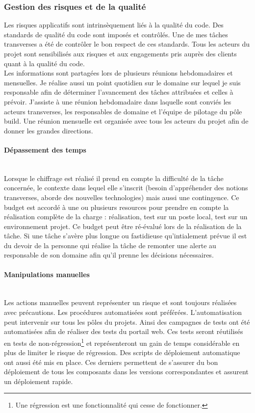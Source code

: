 \documentclass[12pt,a4paper]{article}
\begin{document}
\subsubsection{Gestion des risques et de la qualité}
Les risques applicatifs sont intrinsèquement liés à la qualité du code. Des standards de qualité du code sont imposés et contrôlés. Une de mes tâches transverses a été de contrôler le bon respect de ces standards. Tous les acteurs du projet sont sensibilisés aux risques et aux engagements pris auprès des clients quant à la qualité du code.\\
Les informations sont partagées lors de plusieurs réunions hebdomadaires et mensuelles. Je réalise aussi un point quotidien sur le domaine sur lequel je suis responsable afin de déterminer l'avancement des tâches attribuées et celles à prévoir. J'assiste à une réunion hebdomadaire dans laquelle sont conviés les acteurs transverses, les responsables de domaine et l'équipe de pilotage du pôle build. Une réunion mensuelle est organisée avec tous les acteurs du projet afin de donner les grandes directions.
\paragraph{Dépassement des temps}
~~\\
Lorsque le chiffrage est réalisé il prend en compte la difficulté de la tâche concernée, le contexte dans lequel elle s'inscrit (besoin d'appréhender des notions transverses,  aborde des nouvelles technologies) mais aussi une contingence. Ce budget est accordé à une ou plusieurs resources pour prendre en compte la réalisation complète de la charge : réalisation, test sur un poste local, test sur un environnement projet. Ce budget peut être ré-évalué lors de la réalisation de la tâche. Si une tâche s'avère plus longue ou fastidieuse qu'intialement prévue il est du devoir de la personne qui réalise la tâche de remonter une alerte au responsable de son domaine afin qu'il prenne les décisions nécessaires.
\paragraph{Manipulations manuelles}
~~\\
Les actions manuelles peuvent représenter un risque et sont toujours réalisées avec précautions. Les procédures automatisées sont préférées. L'automatisation peut intervenir sur tous les pôles du projets. Ainsi des campagnes de tests ont été automatisées afin de réaliser des tests du portail web. Ces tests seront réutilisés en tests de non-régression\footnote{Une régression est une fonctionnalité qui cesse de fonctionner.} et représenteront un gain de temps considérable en plus de limiter le risque de régression. Des scripts de déploiement automatique ont aussi été mis en place. Ces derniers permettent de s'assurer du bon déploiement de tous les composants dans les versions correspondantes et assurent un déploiement rapide.  
\end{document}

